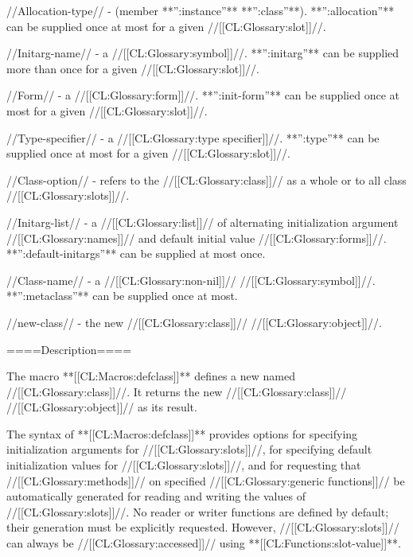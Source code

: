 //Allocation-type// - (member **'':instance''** **'':class''**). **'':allocation''** can be supplied once at most for a given //[[CL:Glossary:slot]]//.

//Initarg-name// - a //[[CL:Glossary:symbol]]//. **'':initarg''** can be supplied more than once for a given //[[CL:Glossary:slot]]//.

//Form// - a //[[CL:Glossary:form]]//. **'':init-form''** can be supplied once at most for a given //[[CL:Glossary:slot]]//.

//Type-specifier// - a //[[CL:Glossary:type specifier]]//. **'':type''** can be supplied once at most for a given //[[CL:Glossary:slot]]//.

//Class-option// - refers to the //[[CL:Glossary:class]]// as a whole or to all class //[[CL:Glossary:slots]]//.

//Initarg-list// - a //[[CL:Glossary:list]]// of alternating initialization argument //[[CL:Glossary:names]]// and default initial value //[[CL:Glossary:forms]]//. **'':default-initargs''** can be supplied at most once.

//Class-name// - a //[[CL:Glossary:non-nil]]// //[[CL:Glossary:symbol]]//. **'':metaclass''** can be supplied once at most.















//new-class// - the new //[[CL:Glossary:class]]// //[[CL:Glossary:object]]//.

====Description====

The macro **[[CL:Macros:defclass]]** defines a new named //[[CL:Glossary:class]]//. It returns the new //[[CL:Glossary:class]]// //[[CL:Glossary:object]]// as its result.

The syntax of **[[CL:Macros:defclass]]** provides options for specifying initialization arguments for //[[CL:Glossary:slots]]//, for specifying default initialization values for //[[CL:Glossary:slots]]//, and for requesting that //[[CL:Glossary:methods]]// on specified //[[CL:Glossary:generic functions]]// be automatically generated for reading and writing the values of //[[CL:Glossary:slots]]//. No reader or writer functions are defined by default; their generation must be explicitly requested. However, //[[CL:Glossary:slots]]// can always be //[[CL:Glossary:accessed]]// using **[[CL:Functions:slot-value]]**.

